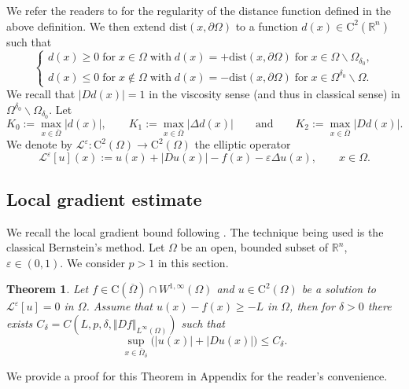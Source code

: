 \documentclass[11pt,reqno]{amsart}
\numberwithin{figure}{section}
\theoremstyle{plain}
\newtheorem{thm}{Theorem}[section]
\theoremstyle{remark}
\numberwithin{equation}{section}
\newcommand{\R}{\mathbb{R}}
\newcommand{\rmC}{\mathrm{C}}
\begin{document}
We refer the readers to \cite{gilbarg_elliptic_2001} for the regularity of the distance function defined in the above definition. We then extend $\mathrm{dist}(x,\partial\Omega)$ to a function $d(x)\in \mathrm{C}^2(\mathbb{R}^n)$ such that 
\begin{equation}\label{e:distance_def}
    \begin{cases}
    d(x)\geq 0\;\text{for}\;x\in\Omega\;\text{with}\;d(x) = +\mathrm{dist}(x,\partial\Omega)\;\text{for}\;x\in \Omega\backslash \Omega_{\delta_0},\\
    d(x)\leq 0\;\text{for}\;x\notin \Omega\;\text{with}\;d(x) = -\mathrm{dist}(x,\partial\Omega)\;\text{for}\;x\in \Omega^{\delta_0}\backslash \Omega.
    \end{cases}
\end{equation}
We recall that $|D d(x)| = 1$ in the viscosity sense (and thus in classical sense) in $\Omega^{\delta_0}\backslash \Omega_{\delta_0}$. Let 
\begin{equation*}
   K_0:= \max_{x\in \overline{\Omega}}|d(x)|, \qquad K_1 := \max_{x\in \overline{\Omega}} |\Delta d(x)| \qquad\text{and}\qquad K_2 := \max_{x\in \overline{\Omega}} |D d(x)|.
\end{equation*}
\noindent We denote by $\mathcal{L}^\varepsilon:\rmC^2(\Omega)\to \rmC^2(\Omega)$ the elliptic operator
\begin{equation*}
    \mathcal{L}^\varepsilon[u](x) :=   u(x) + |Du(x)| - f(x) - \varepsilon \Delta u(x), \qquad x\in \Omega.
\end{equation*}



\subsection{Local gradient estimate} 
We recall the local gradient bound following \cite[Appendix]{Lasry1989}. The technique being used is the classical Bernstein's method. Let $\Omega$ be an open, bounded subset of $\R^n$, $\varepsilon \in (0,1)$. We consider $p>1$ in this section.

\begin{thm}\label{thm:grad_1} Let $f\in \rmC(\overline{\Omega})\cap W^{1,\infty}(\Omega)$ and $u\in \mathrm{C}^2(\Omega)$ be a solution to $\mathcal{L}^\varepsilon[u] = 0$ in $\Omega$. Assume that $  u(x)-f(x)\geq -L$ in $\Omega$, then for $\delta>0$ there exists $C_\delta = C(L,p,\delta, \Vert D f\Vert_{L^\infty(\Omega)})$ such that 
\begin{equation*}
    \sup_{x\in \overline{\Omega}_\delta} \Big(|u(x)|+|Du(x)|\Big) \leq C_\delta.
\end{equation*}
\end{thm}
\noindent We provide a proof for this Theorem in Appendix for the reader's convenience.
\end{document}
